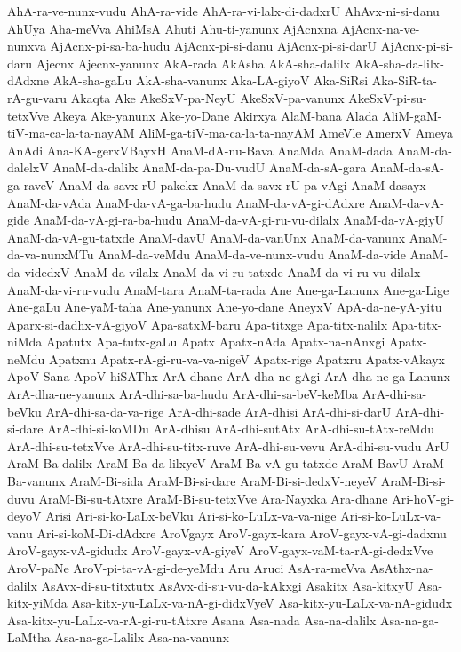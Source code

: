 {AhA-ra-ve-nunx-vudu
AhA-ra-vide
AhA-ra-vi-lalx-di-dadxrU
AhAvx-ni-si-danu
AhUya
Aha-meVva
AhiMsA
Ahuti
Ahu-ti-yanunx
AjAcnxna
AjAcnx-na-ve-nunxva
AjAcnx-pi-sa-ba-hudu
AjAcnx-pi-si-danu
AjAcnx-pi-si-darU
AjAcnx-pi-si-daru
Ajecnx
Ajecnx-yanunx
AkA-rada
AkAsha
AkA-sha-dalilx
AkA-sha-da-lilx-dAdxne
AkA-sha-gaLu
AkA-sha-vanunx
Aka-LA-giyoV
Aka-SiRsi
Aka-SiR-ta-rA-gu-varu
Akaqta
Ake
AkeSxV-pa-NeyU
AkeSxV-pa-vanunx
AkeSxV-pi-su-tetxVve
Akeya
Ake-yanunx
Ake-yo-Dane
Akirxya
AlaM-bana
Alada
AliM-gaM-tiV-ma-ca-la-ta-nayAM
AliM-ga-tiV-ma-ca-la-ta-nayAM
AmeVle
AmerxV
Ameya
AnAdi
Ana-KA-gerxVBayxH
AnaM-dA-nu-Bava
AnaMda
AnaM-dada
AnaM-da-dalelxV
AnaM-da-dalilx
AnaM-da-pa-Du-vudU
AnaM-da-sA-gara
AnaM-da-sA-ga-raveV
AnaM-da-savx-rU-pakekx
AnaM-da-savx-rU-pa-vAgi
AnaM-dasayx
AnaM-da-vAda
AnaM-da-vA-ga-ba-hudu
AnaM-da-vA-gi-dAdxre
AnaM-da-vA-gide
AnaM-da-vA-gi-ra-ba-hudu
AnaM-da-vA-gi-ru-vu-dilalx
AnaM-da-vA-giyU
AnaM-da-vA-gu-tatxde
AnaM-davU
AnaM-da-vanUnx
AnaM-da-vanunx
AnaM-da-va-nunxMTu
AnaM-da-veMdu
AnaM-da-ve-nunx-vudu
AnaM-da-vide
AnaM-da-videdxV
AnaM-da-vilalx
AnaM-da-vi-ru-tatxde
AnaM-da-vi-ru-vu-dilalx
AnaM-da-vi-ru-vudu
AnaM-tara
AnaM-ta-rada
Ane
Ane-ga-Lanunx
Ane-ga-Lige
Ane-gaLu
Ane-yaM-taha
Ane-yanunx
Ane-yo-dane
AneyxV
ApA-da-ne-yA-yitu
Aparx-si-dadhx-vA-giyoV
Apa-satxM-baru
Apa-titxge
Apa-titx-nalilx
Apa-titx-niMda
Apatutx
Apa-tutx-gaLu
Apatx
Apatx-nAda
Apatx-na-nAnxgi
Apatx-neMdu
Apatxnu
Apatx-rA-gi-ru-va-va-nigeV
Apatx-rige
Apatxru
Apatx-vAkayx
ApoV-Sana
ApoV-hiSAThx
ArA-dhane
ArA-dha-ne-gAgi
ArA-dha-ne-ga-Lanunx
ArA-dha-ne-yanunx
ArA-dhi-sa-ba-hudu
ArA-dhi-sa-beV-keMba
ArA-dhi-sa-beVku
ArA-dhi-sa-da-va-rige
ArA-dhi-sade
ArA-dhisi
ArA-dhi-si-darU
ArA-dhi-si-dare
ArA-dhi-si-koMDu
ArA-dhisu
ArA-dhi-sutAtx
ArA-dhi-su-tAtx-reMdu
ArA-dhi-su-tetxVve
ArA-dhi-su-titx-ruve
ArA-dhi-su-vevu
ArA-dhi-su-vudu
ArU
AraM-Ba-dalilx
AraM-Ba-da-lilxyeV
AraM-Ba-vA-gu-tatxde
AraM-BavU
AraM-Ba-vanunx
AraM-Bi-sida
AraM-Bi-si-dare
AraM-Bi-si-dedxV-neyeV
AraM-Bi-si-duvu
AraM-Bi-su-tAtxre
AraM-Bi-su-tetxVve
Ara-Nayxka
Ara-dhane
Ari-hoV-gi-deyoV
Arisi
Ari-si-ko-LaLx-beVku
Ari-si-ko-LuLx-va-va-nige
Ari-si-ko-LuLx-va-vanu
Ari-si-koM-Di-dAdxre
AroVgayx
AroV-gayx-kara
AroV-gayx-vA-gi-dadxnu
AroV-gayx-vA-gidudx
AroV-gayx-vA-giyeV
AroV-gayx-vaM-ta-rA-gi-dedxVve
AroV-paNe
AroV-pi-ta-vA-gi-de-yeMdu
Aru
Aruci
AsA-ra-meVva
AsAthx-na-dalilx
AsAvx-di-su-titxtutx
AsAvx-di-su-vu-da-kAkxgi
Asakitx
Asa-kitxyU
Asa-kitx-yiMda
Asa-kitx-yu-LaLx-va-nA-gi-didxVyeV
Asa-kitx-yu-LaLx-va-nA-gidudx
Asa-kitx-yu-LaLx-va-rA-gi-ru-tAtxre
Asana
Asa-nada
Asa-na-dalilx
Asa-na-ga-LaMtha
Asa-na-ga-Lalilx
Asa-na-vanunx
}

